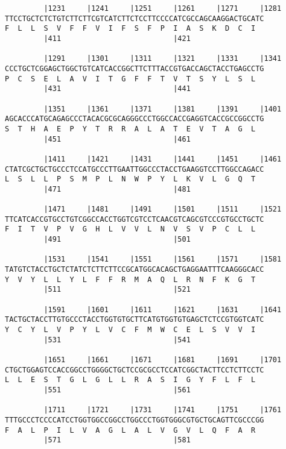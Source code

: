 \documentclass{article}
\begin{document}
\begin{Verbatim}
         |1231     |1241     |1251     |1261     |1271     |1281
TTCCTGCTCTCTGTCTTCTTCGTCATCTTCTCCTTCCCCATCGCCAGCAAGGACTGCATC
F  L  L  S  V  F  F  V  I  F  S  F  P  I  A  S  K  D  C  I  
         |411                          |421                 
  
         |1291     |1301     |1311     |1321     |1331     |1341
CCCTGCTCGGAGCTGGCTGTCATCACCGGCTTCTTTACCGTGACCAGCTACCTGAGCCTG
P  C  S  E  L  A  V  I  T  G  F  F  T  V  T  S  Y  L  S  L  
         |431                          |441                 
  
         |1351     |1361     |1371     |1381     |1391     |1401
AGCACCCATGCAGAGCCCTACACGCGCAGGGCCCTGGCCACCGAGGTCACCGCCGGCCTG
S  T  H  A  E  P  Y  T  R  R  A  L  A  T  E  V  T  A  G  L  
         |451                          |461                 
  
         |1411     |1421     |1431     |1441     |1451     |1461
CTATCGCTGCTGCCCTCCATGCCCTTGAATTGGCCCTACCTGAAGGTCCTTGGCCAGACC
L  S  L  L  P  S  M  P  L  N  W  P  Y  L  K  V  L  G  Q  T  
         |471                          |481                 
  
         |1471     |1481     |1491     |1501     |1511     |1521
TTCATCACCGTGCCTGTCGGCCACCTGGTCGTCCTCAACGTCAGCGTCCCGTGCCTGCTC
F  I  T  V  P  V  G  H  L  V  V  L  N  V  S  V  P  C  L  L  
         |491                          |501                 
  
         |1531     |1541     |1551     |1561     |1571     |1581
TATGTCTACCTGCTCTATCTCTTCTTCCGCATGGCACAGCTGAGGAATTTCAAGGGCACC
Y  V  Y  L  L  Y  L  F  F  R  M  A  Q  L  R  N  F  K  G  T  
         |511                          |521                 
  
         |1591     |1601     |1611     |1621     |1631     |1641
TACTGCTACCTTGTGCCCTACCTGGTGTGCTTCATGTGGTGTGAGCTCTCCGTGGTCATC
Y  C  Y  L  V  P  Y  L  V  C  F  M  W  C  E  L  S  V  V  I  
         |531                          |541                 
  
         |1651     |1661     |1671     |1681     |1691     |1701
CTGCTGGAGTCCACCGGCCTGGGGCTGCTCCGCGCCTCCATCGGCTACTTCCTCTTCCTC
L  L  E  S  T  G  L  G  L  L  R  A  S  I  G  Y  F  L  F  L  
         |551                          |561                 
  
         |1711     |1721     |1731     |1741     |1751     |1761
TTTGCCCTCCCCATCCTGGTGGCCGGCCTGGCCCTGGTGGGCGTGCTGCAGTTCGCCCGG
F  A  L  P  I  L  V  A  G  L  A  L  V  G  V  L  Q  F  A  R  
         |571                          |581                 
  

\end{Verbatim}
\end{document}

